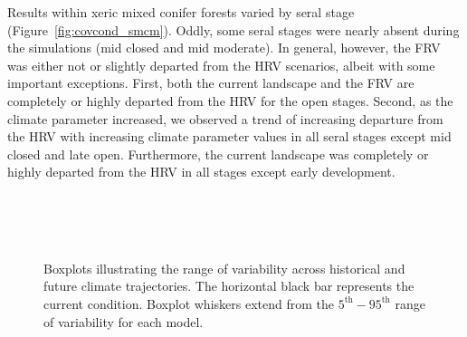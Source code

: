 \documentclass[12pt]{article}
\begin{document}
\begin{spacing}{1}
Results within xeric mixed conifer forests varied by seral stage (Figure~\ref{fig:covcond_smcm}). Oddly, some seral stages were nearly absent during the simulations (mid closed and mid moderate). In general, however, the FRV was either not or slightly departed from the HRV scenarios, albeit with some important exceptions. First, both the current landscape and the FRV are completely or highly departed from the HRV for the open stages. Second, as the climate parameter increased, we observed a trend of increasing departure from the HRV with increasing climate parameter values in all seral stages except mid closed and late open. Furthermore, the current landscape was completely or highly departed from the HRV in all stages except early development. 






\begin{figure}[htbp]
  \centering
   \\
   \\
       \\
    \caption{Boxplots illustrating the range of variability across historical and future climate trajectories. The horizontal black bar represents the current condition. Boxplot whiskers extend from the $5^{\text{th}} - 95^{\text{th}}$ range of variability for each model. }
  \label{fig:covcond_smcx}
\end{figure} %














\end{spacing}
\end{document}
